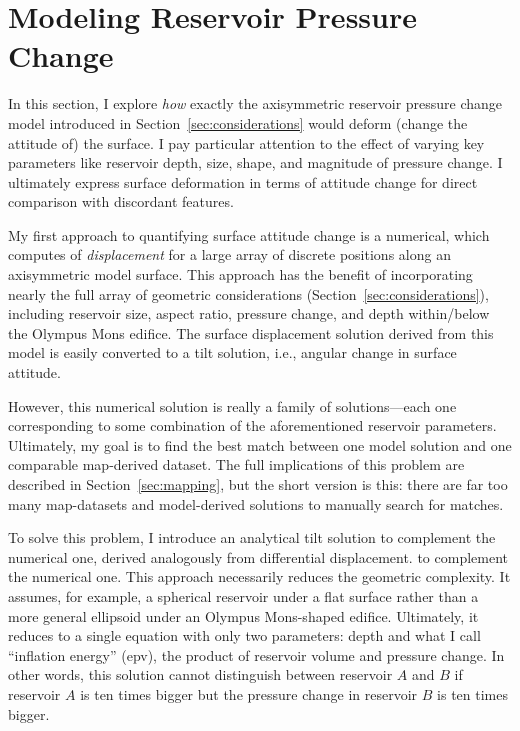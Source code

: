 \section{Modeling Reservoir Pressure Change}\label{sec:modeling}

In this section, I explore \emph{how} exactly the axisymmetric reservoir pressure change model introduced in Section~\ref{sec:considerations} would deform (change the attitude of) the surface. I pay particular attention to the effect of varying key parameters like reservoir depth, size, shape, and magnitude of pressure change. I ultimately express surface deformation in terms of attitude change for direct comparison with discordant features.

My first approach to quantifying surface attitude change is a numerical, which computes of \emph{displacement} for a large array of discrete positions along an axisymmetric model surface. This approach has the benefit of incorporating nearly the full array of geometric considerations (Section~\ref{sec:considerations}), including reservoir size, aspect ratio, pressure change, and depth within/below the Olympus Mons edifice. The surface displacement solution derived from this model is easily converted to a tilt solution, i.e., angular change in surface attitude.

However, this numerical solution is really a family of solutions---each one corresponding to some combination of the aforementioned reservoir parameters. Ultimately, my goal is to find the best match between one model solution and one comparable map-derived dataset. The full implications of this problem are described in Section~\ref{sec:mapping}, but the short version is this: there are far too many map-datasets and model-derived solutions to manually search for matches.

To solve this problem, I introduce an analytical tilt solution to complement the numerical one, derived analogously from differential displacement. to complement the numerical one. This approach necessarily reduces the geometric complexity. It assumes, for example, a spherical reservoir under a flat surface rather than a more general ellipsoid under an Olympus Mons-shaped edifice. Ultimately, it reduces to a single equation with only two parameters: depth and what I call ``inflation energy'' (\acs{epv}), the product of reservoir volume and pressure change. In other words, this solution cannot distinguish between reservoir $A$ and $B$ if reservoir $A$ is ten times bigger but the pressure change in reservoir $B$ is ten times bigger.

